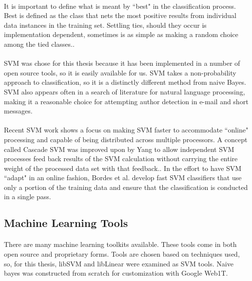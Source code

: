 			\paragraph{} It is important to define what is meant by ``best" in the classification process.  Best is defined as the class that nets the most positive results from individual data instances in the training set. Settling ties, should they occur is implementation dependent, sometimes is as simple as making a random choice among the tied classes.\cite{_multiclass_????}.
			
			\paragraph{} SVM was chose for this thesis because it has been implemented in a number of open source tools, so it is easily available for us.  SVM takes a non-probability approach to classification, so it is a distinctly different method from naive Bayes.  SVM also appears often in a search of literature for natural language processing, making it a reasonable choice for attempting author detection in e-mail and short messages.

	\paragraph{} Recent SVM work shows a focus on making SVM faster to accommodate ``online" processing and capable of being distributed across multiple processors.  A concept called Cascade SVM was improved upon by Yang to allow independent SVM processes feed back results of the SVM calculation without carrying the entire weight of the processed data set with that feedback.\cite{yang_improved_2006}.  In the effort to have SVM ``adapt" in an online fashion, Bordes et al. develop fast SVM classifiers that use only a portion of the training data and ensure that the classification is conducted in a single pass. \cite{bordes_fast_2005}

	\subsection {Machine Learning Tools}
	\paragraph{} There are many machine learning toolkits available.  These tools come in both open source and proprietary forms.  Tools are chosen based on techniques used, so, for this thesis, libSVM and libLinear were examined as SVM tools.  Naive bayes was constructed from scratch for customization with Google Web1T.


